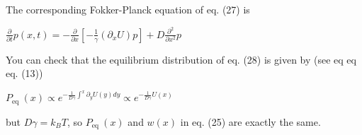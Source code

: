 The corresponding Fokker-Planck equation of eq. (27) is
\begin{DispWithArrows}[displaystyle, format=c]
  $\frac{\partial}{\partial t} p(x, t)=-\frac{\partial}{\partial x}\left[-\frac{1}{\gamma}\left(\partial_{x} U\right) p\right]+D \frac{\partial^{2}}{\partial x^{2}} p$
\end{DispWithArrows}
You can check that the equilibrium distribution of eq. (28) is given by (see
eq eq eq. (13))
\begin{DispWithArrows}[displaystyle, format=c]
  $P_{\text {eq }}(x) \propto e^{-\frac{1}{D \gamma} \int^{x} \partial_{y} U(y) d y} \propto e^{-\frac{1}{D \gamma} U(x)}$
\end{DispWithArrows}
but $D \gamma=k_{B} T$, so $P_{\text {eq }}(x)$ and $w(x)$ in eq. (25) are
exactly the same.

